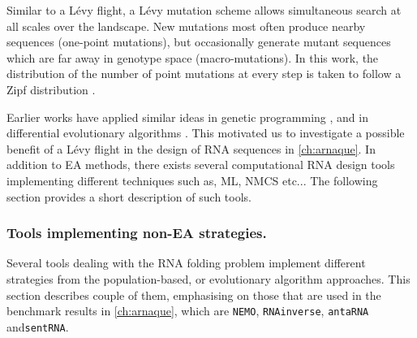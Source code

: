 Similar to a Lévy flight, a Lévy mutation scheme allows simultaneous search at all scales over the landscape. New mutations most often produce nearby sequences (one-point mutations), but occasionally generate mutant sequences which are far away in genotype space (macro-mutations). In this work, the distribution of the number of point mutations at every step is taken to follow a Zipf distribution \cite{newman2005power}. 

Earlier works have applied similar ideas in genetic programming  \cite{LevyGP}, and in differential evolutionary algorithms \cite{sharma2015modified}. This motivated us to investigate a possible benefit of a Lévy flight in the design of \ac{RNA} sequences in \autoref{ch:arnaque}. In addition to \ac{EA} methods, there exists several computational RNA design tools implementing different techniques such as, \ac{ML}, \ac{NMCS} etc... The following section provides a short description of such tools.

\subsubsection{Tools implementing non-EA strategies.}

Several tools dealing with the \ac{RNA} folding problem implement different strategies from the population-based, or evolutionary algorithm approaches. This section describes couple of them, emphasising on those that are used in the benchmark results in \autoref{ch:arnaque}, which are \texttt{NEMO}, \texttt{RNAinverse}, \texttt{antaRNA} and\texttt{sentRNA}. 

